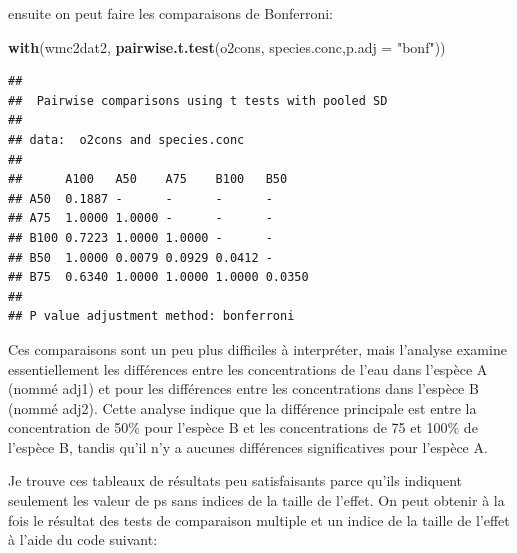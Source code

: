 \documentclass[12pt,]{book}
\newenvironment{Shaded}{\begin{snugshade}}{\end{snugshade}}
\newcommand{\DataTypeTok}[1]{\textcolor[rgb]{0.13,0.29,0.53}{#1}}
\newcommand{\KeywordTok}[1]{\textcolor[rgb]{0.13,0.29,0.53}{\textbf{#1}}}
\newcommand{\NormalTok}[1]{#1}
\newcommand{\OperatorTok}[1]{\textcolor[rgb]{0.81,0.36,0.00}{\textbf{#1}}}
\newcommand{\StringTok}[1]{\textcolor[rgb]{0.31,0.60,0.02}{#1}}
\begin{document}
\begin{Shaded}
\end{Shaded}

ensuite on peut faire les comparaisons de Bonferroni:

\begin{Shaded}
\begin{Highlighting}[]
\KeywordTok{with}\NormalTok{(wmc2dat2, }\KeywordTok{pairwise.t.test}\NormalTok{(o2cons, species.conc,}\DataTypeTok{p.adj =} \StringTok{"bonf"}\NormalTok{))}
\end{Highlighting}
\end{Shaded}

\begin{verbatim}
## 
##  Pairwise comparisons using t tests with pooled SD 
## 
## data:  o2cons and species.conc 
## 
##      A100   A50    A75    B100   B50   
## A50  0.1887 -      -      -      -     
## A75  1.0000 1.0000 -      -      -     
## B100 0.7223 1.0000 1.0000 -      -     
## B50  1.0000 0.0079 0.0929 0.0412 -     
## B75  0.6340 1.0000 1.0000 1.0000 0.0350
## 
## P value adjustment method: bonferroni
\end{verbatim}

Ces comparaisons sont un peu plus difficiles à interpréter, mais l'analyse examine essentiellement les différences entre les concentrations de l'eau dans l'espèce A (nommé adj1) et pour les différences entre les concentrations dans l'espèce B (nommé adj2). Cette analyse indique que la différence principale est entre la concentration de 50\% pour l'espèce B et les concentrations de 75 et 100\% de l'espèce B, tandis qu'il n'y a aucunes différences significatives pour l'espèce A.

Je trouve ces tableaux de résultats peu satisfaisants parce qu'ils indiquent seulement les valeur de ps sans indices de la taille de l'effet. On peut obtenir à la fois le résultat des tests de comparaison multiple et un indice de la taille de l'effet à l'aide du code suivant:
\end{document}
